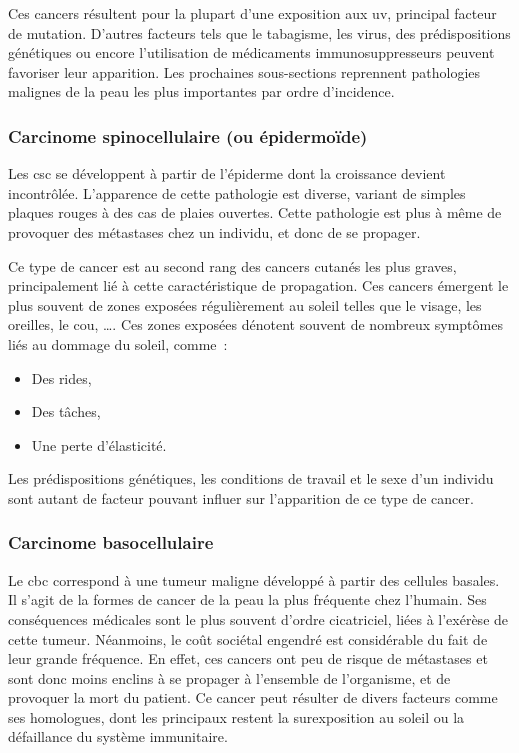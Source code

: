 Ces cancers résultent pour la plupart d’une exposition aux \gls{uv}, principal facteur de mutation. D’autres facteurs tels que le tabagisme, les virus, des prédispositions génétiques ou encore l’utilisation de médicaments immunosuppresseurs peuvent favoriser leur apparition. Les prochaines sous-sections reprennent pathologies malignes de la peau les plus importantes par ordre d'incidence.\par

\subsubsection{Carcinome spinocellulaire (ou épidermoïde)}
Les \gls{csc} se développent à partir de l'épiderme dont la croissance devient incontrôlée. L’apparence de cette pathologie est diverse, variant de simples plaques rouges à des cas de plaies ouvertes. Cette pathologie est plus à même de provoquer des métastases chez un individu, et donc de se propager.\par

Ce type de cancer est au second rang des cancers cutanés les plus graves, principalement lié à cette caractéristique de propagation. Ces cancers émergent le plus souvent de zones exposées régulièrement au soleil telles que le visage, les oreilles, le cou, \ldots. Ces zones exposées dénotent souvent de nombreux symptômes liés au dommage du soleil, comme~:
\begin{itemize}
\item Des rides,
\item Des tâches,
\item Une perte d’élasticité.
\end{itemize}
Les prédispositions génétiques, les conditions de travail et le sexe d’un individu sont autant de facteur pouvant influer sur l’apparition de ce type de cancer.\par

\subsubsection{Carcinome basocellulaire}	
Le \gls{cbc} correspond à une tumeur maligne développé à partir des cellules basales. Il s’agit de la formes de cancer de la peau la plus fréquente chez l'humain. Ses conséquences médicales sont le plus souvent d'ordre cicatriciel, liées à l'exérèse de cette tumeur. Néanmoins, le coût sociétal engendré est considérable du fait de leur grande fréquence. En effet, ces cancers ont peu de risque de métastases et sont donc moins enclins à se propager à l’ensemble de l’organisme, et de provoquer la mort du patient. Ce cancer peut résulter de divers facteurs comme ses homologues, dont les principaux restent la surexposition au soleil ou la défaillance du système immunitaire.\par


